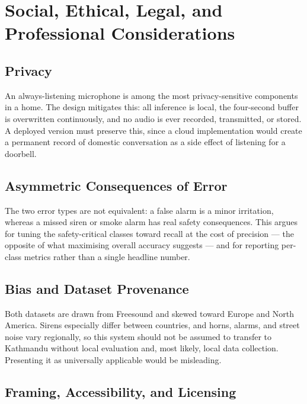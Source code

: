 \documentclass[11pt, a4paper]{article}
\begin{document}
\section{Social, Ethical, Legal, and Professional Considerations}
\label{sec:ethics}

\subsection{Privacy}

An always-listening microphone is among the most privacy-sensitive components in a home. The design mitigates this: all inference is local, the four-second buffer is overwritten continuously, and no audio is ever recorded, transmitted, or stored. A deployed version must preserve this, since a cloud implementation would create a permanent record of domestic conversation as a side effect of listening for a doorbell.

\subsection{Asymmetric Consequences of Error}

The two error types are not equivalent: a false alarm is a minor irritation, whereas a missed siren or smoke alarm has real safety consequences. This argues for tuning the safety-critical classes toward recall at the cost of precision --- the opposite of what maximising overall accuracy suggests --- and for reporting per-class metrics rather than a single headline number.

\subsection{Bias and Dataset Provenance}

Both datasets are drawn from Freesound and skewed toward Europe and North America. Sirens especially differ between countries, and horns, alarms, and street noise vary regionally, so this system should not be assumed to transfer to Kathmandu without local evaluation and, most likely, local data collection. Presenting it as universally applicable would be misleading.

\subsection{Framing, Accessibility, and Licensing}
\end{document}
